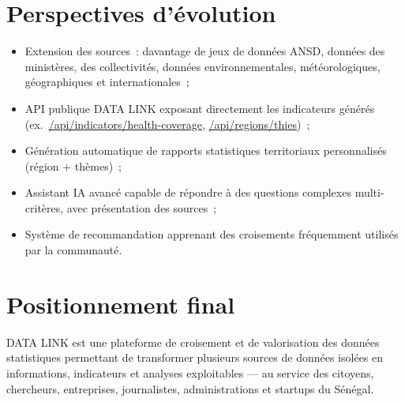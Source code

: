\documentclass[11pt,a4paper]{article}
\begin{document}
\section{Perspectives d'évolution}

\begin{itemize}
  \item Extension des sources~: davantage de jeux de données ANSD, données des ministères, des collectivités, données environnementales, météorologiques, géographiques et internationales~;
  \item API publique DATA LINK exposant directement les indicateurs générés (ex.~\small\url{/api/indicators/health-coverage}\normalsize, \small\url{/api/regions/thies}\normalsize)~;
  \item Génération automatique de rapports statistiques territoriaux personnalisés (région + thèmes)~;
  \item Assistant IA avancé capable de répondre à des questions complexes multi-critères, avec présentation des sources~;
  \item Système de recommandation apprenant des croisements fréquemment utilisés par la communauté.
\end{itemize}

\section{Positionnement final}

DATA LINK est une plateforme de croisement et de valorisation des données statistiques permettant de transformer plusieurs sources de données isolées en informations, indicateurs et analyses exploitables --- au service des citoyens, chercheurs, entreprises, journalistes, administrations et startups du Sénégal.
\end{document}
